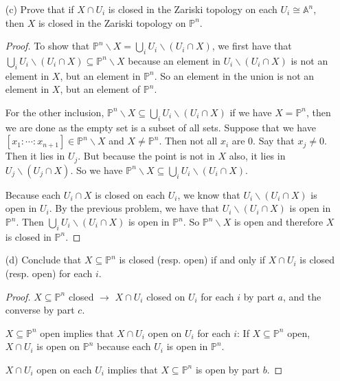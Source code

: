 \documentclass{article}
\begin{document}
\begin{itemize}
        \item [(c)] Prove that if $X \cap U_{i}$ is closed in the Zariski topology on each $U_{i} \cong \mathbb{A}^{n}$, then $X$ is closed in the Zariski topology on $\mathbb{P}^{n}$.
            \begin{proof}
                To show that $\mathbb{P}^{n} \backslash X = \bigcup_{i} U_{i} \backslash (U_{i} \cap X)$, we first have that $\bigcup_{i} U_{i} \backslash (U_{i} \cap X) \subseteq \mathbb{P}^{n}\backslash X$ because an element in $U_{i} \backslash (U_{i} \cap X)$ is not an element in $X$, but an element in $\mathbb{P}^{n}$. So an element in the union is not an element in $X$, but an element of $\mathbb{P}^{n}$.

                For the other inclusion, $\mathbb{P}^{n}\backslash X \subseteq \bigcup_{i} U_{i} \backslash (U_{i} \cap X)$ if we have $X = \mathbb{P}^{n}$, then we are done as the empty set is a subset of all sets. Suppose that we have $[x_{1}: \cdots : x_{n + 1}] \in \mathbb{P}^{n} \backslash X$ and $X \neq \mathbb{P}^{n}$. Then not all $x_{i}$ are $0$. Say that $x_{j} \neq 0$. Then it lies in $U_{j}$. But because the point is not in $X$ also, it lies in $U_{j} \backslash (U_{j} \cap X)$. So we have $\mathbb{P}^{n} \backslash X \subseteq \bigcup_{i} U_{i} \backslash (U_{i} \cap X)$.

                Because each $U_{i} \cap X$ is closed on each $U_{i}$, we know that $U_{i} \backslash (U_{i} \cap X)$ is open in $U_{i}$. By the previous problem, we have that $U_{i} \backslash (U_{i} \cap X)$ is open in $\mathbb{P}^{n}$. Then $\bigcup_{i} U_{i} \backslash (U_{i} \cap X)$ is open in $\mathbb{P}^{n}$. So $\mathbb{P}^{n}\backslash X$ is open and therefore $X$ is closed in $\mathbb{P}^{n}$.
            \end{proof}

        \item [(d)] Conclude that $X \subseteq \mathbb{P}^{n}$ is closed (resp. open) if and only if $X \cap U_{i}$ is closed (resp. open) for each $i$. 
            \begin{proof}
                $X \subseteq \mathbb{P}^{n}$ closed $\rightarrow$ $X \cap U_{i}$ closed on $U_{i}$ for each $i$ by part $a$, and the converse by part $c$.

                $X \subseteq \mathbb{P}^{n}$ open implies that $X \cap U_{i}$ open on $U_{i}$ for each $i$: If $X \subseteq \mathbb{P}^{n}$ open, $X \cap U_{i}$ is open on $\mathbb{P}^{n}$ because each $U_{i}$ is open in $\mathbb{P}^{n}$. 

                $X \cap U_{i}$ open on each $U_{i}$ implies that $X \subseteq \mathbb{P}^{n}$ is open by part $b$.
            \end{proof}
    \end{itemize}
\end{document}
